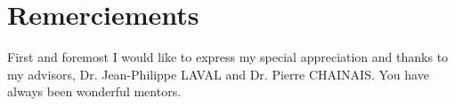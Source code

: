 \chapter{Remerciements}
First and foremost I would like to express my special appreciation and thanks to my advisors, Dr. Jean-Philippe LAVAL and Dr. Pierre CHAINAIS. You have always been wonderful mentors.